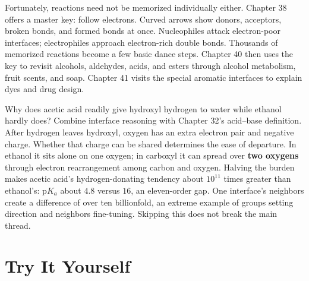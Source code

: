 Fortunately, reactions need not be memorized individually either. Chapter 38 offers a master key: follow electrons. Curved arrows show donors, acceptors, broken bonds, and formed bonds at once. Nucleophiles attack electron-poor interfaces; electrophiles approach electron-rich double bonds. Thousands of memorized reactions become a few basic dance steps. Chapter 40 then uses the key to revisit alcohols, aldehydes, acids, and esters through alcohol metabolism, fruit scents, and soap. Chapter 41 visits the special aromatic interfaces to explain dyes and drug design.

\begin{tiaozhan}
Why does acetic acid readily give hydroxyl hydrogen to water while ethanol hardly does? Combine interface reasoning with Chapter 32's acid--base definition. After hydrogen leaves hydroxyl, oxygen has an extra electron pair and negative charge. Whether that charge can be shared determines the ease of departure. In ethanol it sits alone on one oxygen; in carboxyl it can spread over \textbf{two oxygens} through electron rearrangement among carbon and oxygen. Halving the burden makes acetic acid's hydrogen-donating tendency about $10^{11}$ times greater than ethanol's: p$K_a$ about $4.8$ versus $16$, an eleven-order gap. One interface's neighbors create a difference of over ten billionfold, an extreme example of groups setting direction and neighbors fine-tuning. Skipping this does not break the main thread.
\end{tiaozhan}

\section*{Try It Yourself}

